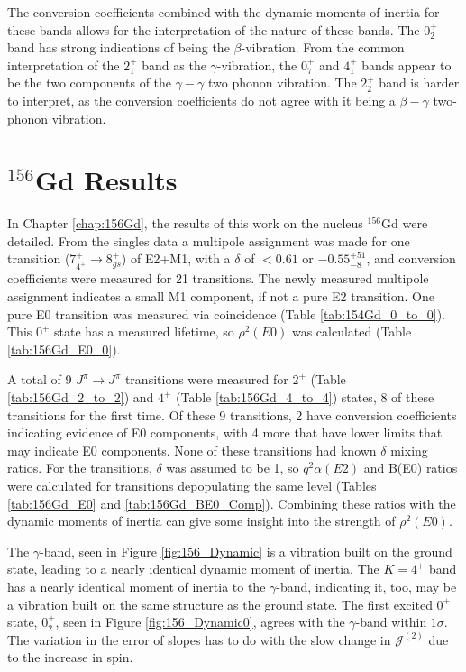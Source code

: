 The conversion coefficients combined with the dynamic moments of inertia for these bands allows for the interpretation of the nature of these bands. The $0^+_2$ band has strong indications of being the $\beta$-vibration. From the common interpretation of the $2^+_1$ band as the $\gamma$-vibration, the $0^+_7$ and $4^+_1$ bands appear to be the two components of the $\gamma-\gamma$ two phonon vibration. The $2^+_2$ band is harder to interpret, as the conversion coefficients do not agree with it being a $\beta-\gamma$ two-phonon vibration.



\section{$^{156}$Gd Results}
\label{sec:156_Dynamic}

In Chapter \ref{chap:156Gd}, the results of this work on the nucleus $^{156}$Gd were detailed. From the singles data a multipole assignment was made for one transition ($7^+_{4^+}\rightarrow 8^+_{gs}$) of E2+M1, with a $\delta$ of $<0.61$ or $-0.55^{+51}_{-8}$, and conversion coefficients were measured for 21 transitions. The newly measured multipole assignment indicates a small M1 component, if not a pure E2 transition. One pure E0 transition was measured via coincidence (Table \ref{tab:154Gd_0_to_0}). This $0^+$ state has a measured lifetime, so $\rho^2(E0)$ was calculated (Table \ref{tab:156Gd_E0_0}).

A total of 9 $J^{\pi}\rightarrow J^{\pi}$ transitions were measured for $2^+$ (Table \ref{tab:156Gd_2_to_2}) and $4^+$ (Table \ref{tab:156Gd_4_to_4}) states, 8 of these transitions for the first time. Of these 9 transitions, 2 have conversion coefficients indicating evidence of E0 components, with 4 more that have lower limits that may indicate E0 components. None of these transitions had known $\delta$ mixing ratios. For the transitions, $\delta$ was assumed to be 1, so $q^2\alpha(E2)$ and B(E0) ratios were calculated for transitions depopulating the same level (Tables \ref{tab:156Gd_E0} and \ref{tab:156Gd_BE0_Comp}). Combining these ratios with the dynamic moments of inertia can give some insight into the strength of $\rho^2(E0)$.







The $\gamma$-band, seen in Figure \ref{fig:156_Dynamic} is a vibration built on the ground state, leading to a nearly identical dynamic moment of inertia. The $K=4^+$ band has a nearly identical moment of inertia to the $\gamma$-band, indicating it, too, may be a vibration built on the same structure as the ground state. The first excited $0^+$ state, $0^+_2$, seen in Figure \ref{fig:156_Dynamic0}, agrees with the $\gamma$-band within $1\sigma$. The variation in the error of slopes has to do with the slow change in $\mathcal{J}^{(2)}$ due to the increase in spin. 

